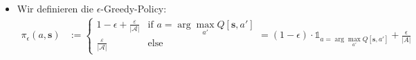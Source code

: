 \begin{beweis}
\begin{itemize}
\begin{align*}
          + \alpha \cdot
          \left[
              \rot{\mathcal{T}[Q_k](\bm{s}, a)} - Q_k(\bm{s}, a) +
              \underbrace{
                  R_a(\bm{s},\bm{s}') + \gamma \cdot \max_{a'} Q_k(\bm{s}', a')
                  \rot{- \mathcal{T}[Q_k](\bm{s}, a)}}_{
                      \eta_k
                  }
          \right]
          \\
          &=  Q_k(\bm{s}, a)
          + \alpha \cdot
          \left[
              \vphantom{\int}
              \mathcal{T}[Q_k](\bm{s}, a) - Q_k(\bm{s}, a)
              + \eta_k
          \right]
      \end{align*}
      Für den Erwartungswert des Rauschterms $\eta_k$ gilt:
      \begin{align*}
          \mathsf{E}_{\bm{s}' \sim T_a(\bm{s})}
          \left[
              \eta_k \mid Q_k
          \right]
          &=
          \mathsf{E}_{\bm{s}' \sim T_a(\bm{s})}
          \left[
              R_a(\bm{s},\bm{s}') + \gamma \cdot \max_{a'} Q_k(\bm{s}', a')
              - 
              \underbrace{\mathcal{T}[Q_k](\bm{s}, a)}_{
                  \text{deterministic}
              }
              \mid Q_k
          \right]
          = 0
      \end{align*}
      \item Wir definieren die $\epsilon$-Greedy-Policy:
      \begin{align*}
          \pi_{\epsilon}(a, \bm{s})
          &:=
          \begin{cases}
              1- \epsilon + \frac{\varepsilon}{|\mathcal{A}|} & \text{if } a = \arg\max_{a'} Q[\bm{s}, a'] \\
              \frac{\varepsilon}{|\mathcal{A}|} & \text{else}
          \end{cases}
          =
          (1-\epsilon) \cdot \mathds{1}_{a = \arg\max_{a'} Q[\bm{s}, a']} 
          + \frac{\epsilon}{|A|}
      \end{align*}
  \end{itemize}
\end{beweis}


\newpage

\printbibliography

